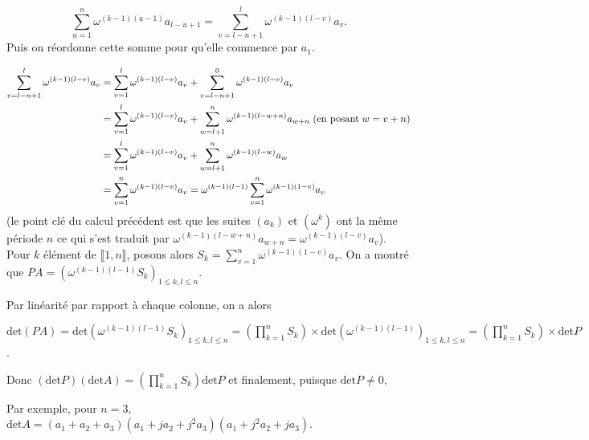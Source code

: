 {{$$\sum_{u=1}^{n}\omega^{(k-1)(u-1)}a_{l-u+1}=\sum_{v=l-n+1}^{l}\omega^{(k-1)(l-v)}a_v.$$
Puis on réordonne cette somme pour qu'elle commence par $a_1$.

\begin{align*}\ensuremath
\sum_{v=l-n+1}^{l}\omega^{(k-1)(l-v)}a_v&=\sum_{v=1}^{l}\omega^{(k-1)(l-v)}a_v
+\sum_{v=l-n+1}^{0}\omega^{(k-1)(l-v)}a_v\\
 &=\sum_{v=1}^{l}\omega^{(k-1)(l-v)}a_v+\sum_{w=l+1}^{n}\omega^{(k-1)(l-w+n)}a_{w+n}\;(\mbox{en posant}\;w=v+n)\\
 &=\sum_{v=1}^{l}\omega^{(k-1)(l-v)}a_v+\sum_{w=l+1}^{n}\omega^{(k-1)(l-w)}a_{w}\\
 &=\sum_{v=1}^{n}\omega^{(k-1)(l-v)}a_v=\omega^{(k-1)(l-1)}\sum_{v=1}^{n}\omega^{(k-1)(1-v)}a_v
\end{align*}
(le point clé du calcul précédent est que les suites $(a_k)$ et $(\omega^k)$ ont la même période $n$ ce qui s'est traduit par
$\omega^{(k-1)(l-w+n)}a_{w+n}=\omega^{(k-1)(l-v)}a_v$).
Pour $k$ élément de $\llbracket1,n\rrbracket$, posons alors $S_k=\sum_{v=1}^{n}\omega^{(k-1)(1-v)}a_v$. On a montré que $PA=(\omega^{(k-1)(l-1)}S_k)_{1\leq k,l\leq n}$.

Par linéarité par rapport à chaque colonne, on a alors

\begin{center}
$\mbox{det}(PA)=\mbox{det}(\omega^{(k-1)(l-1)}S_k)_{1\leq k,l\leq n}=\left(\prod_{k=1}^{n}S_k\right)\times\mbox{det}(\omega^{(k-1)(l-1)})_{1\leq k,l\leq n}=\left(\prod_{k=1}^{n}S_k\right)\times\mbox{det}P$.
\end{center}
Donc $(\mbox{det}P)(\mbox{det}A)=\left(\prod_{k=1}^{n}S_k\right)\mbox{det}P$ et finalement, puisque $\mbox{det}P\neq0$,

\begin{center}
\end{center}
Par exemple, pour $n=3$, $\mbox{det}A=(a_1+a_2+a_3)(a_1+ja_2+j^2a_3)(a_1+j^2a_2+ja_3)$.}
}